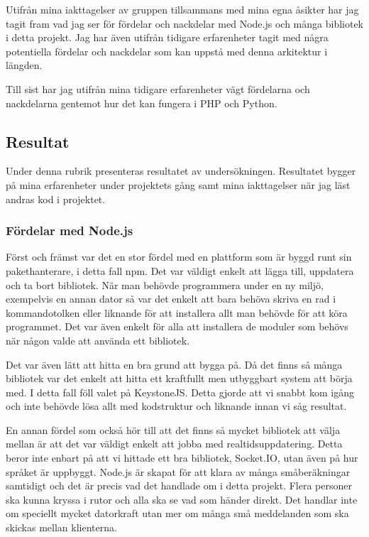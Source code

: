 Utifrån mina iakttagelser av gruppen tillsammans med mina egna åsikter har jag tagit fram vad jag ser för fördelar och nackdelar med Node.js och många bibliotek i detta projekt. Jag har även utifrån tidigare erfarenheter tagit med några potentiella fördelar och nackdelar som kan uppstå med denna arkitektur i längden.

Till sist har jag utifrån mina tidigare erfarenheter vägt fördelarna och nackdelarna gentemot hur det kan fungera i PHP och Python. 

\subsection{Resultat}

Under denna rubrik presenteras resultatet av undersökningen. Resultatet bygger på mina erfarenheter under projektets gång samt mina iakttagelser när jag läst andras kod i projektet.

\subsubsection{Fördelar med Node.js}

Först och främst var det en stor fördel med en plattform som är byggd runt sin pakethanterare, i detta fall npm. Det var väldigt enkelt att lägga till, uppdatera och ta bort bibliotek. När man behövde programmera under en ny miljö, exempelvis en annan dator så var det enkelt att bara behöva skriva en rad i kommandotolken eller liknande för att installera allt man behövde för att köra programmet. Det var även enkelt för alla att installera de moduler som behövs när någon valde att använda ett bibliotek.

Det var även lätt att hitta en bra grund att bygga på. Då det finns så många bibliotek var det enkelt att hitta ett kraftfullt men utbyggbart system att börja med. I detta fall föll valet på KeystoneJS. Detta gjorde att vi snabbt kom igång och inte behövde lösa allt med kodstruktur och liknande innan vi såg resultat.

En annan fördel som också hör till att det finns så mycket bibliotek att välja mellan är att det var väldigt enkelt att jobba med realtidsuppdatering. Detta beror inte enbart på att vi hittade ett bra bibliotek, Socket.IO, utan även på hur språket är uppbyggt. Node.js är skapat för att klara av många småberäkningar samtidigt och det är precis vad det handlade om i detta projekt. Flera personer ska kunna kryssa i rutor och alla ska se vad som händer direkt. Det handlar inte om speciellt mycket datorkraft utan mer om många små meddelanden som ska skickas mellan klienterna.

